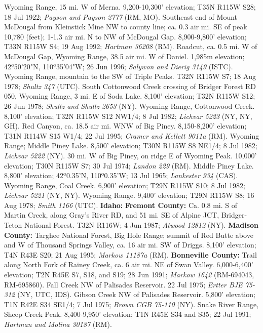 Wyoming Range, 15 mi. W of Merna. 9,200-10,300' elevation; T35N R115W S28;
18 Jul 1922; \textit{Payson and Payson 2777} (RM, MO).
Southeast end of Mount McDougal from Kleinstick Mine NW to county line; ca. 0.3
air mi. SE of peak 10,780 (feet); 1-1.3 air mi. N to NW of McDougal Gap.
8,900-9,800' elevation; T33N R115W S4; 19 Aug 1992; \textit{Hartman 36208} (RM).
Roadcut, ca. 0.5 mi. W of McDougal Gap, Wyoming Range, 38.5 air mi. W of Daniel.
1,985m elevation; 42º50'20"N, 110º35'04"W; 26 Jun 1996;
\textit{Salywon and Dierig 3149} (ISTC).
Wyoming Range, mountain to the SW of Triple Peaks. T32N R115W S7; 18 Aug 1978;
\textit{Shultz 347} (UTC).
South Cottonwood Creek crossing of Bridger Forest RD 050, Wyoming Range,
3 mi. E of Soda Lake. 8,100' elevation; T32N R115W S12; 26 Jun 1978;
\textit{Shultz and Shultz 2653} (NY).
Wyoming Range, Cottonwood Creek. 8,100' elevation; T32N R115W S12 NW1/4;
8 Jul 1982; \textit{Lichvar 5223} (NY, NY, GH).
Red Canyon, ca. 18.5 air mi. WNW of Big Piney. 8,150-8,200' elevation;
T31N R114W S15 W1/4; 22 Jul 1995; \textit{Cramer and Kellett 9011a} (RM).
Wyoming Range; Middle Piney Lake. 8,500' elevation; T30N R115W S8 NE1/4;
8 Jul 1982; \textit{Lichvar 5222} (NY).
30 mi. W of Big Piney, on ridge E of Wyoming Peak. 10,000' elevation;
T30N R115W S7; 30 Jul 1974; \textit{Landon 229} (RM).
Middle Piney Lake. 8,800' elevation; 42º0.35'N, 110º0.35'W; 13 Jul 1965;
\textit{Lankester 934} (CAS).
Wyoming Range, Coal Creek. 6,900' elevation; T29N R115W S10; 8 Jul 1982;
\textit{Lichvar 5221} (NY, NY).
Wyoming Range. 9,400' elevation; T29N R115W S8; 16 Aug 1978;
\textit{Smith 1166} (UTC).
  \textbf{Idaho:}
  \textbf{Fremont County:}
Ca. 0.8 mi. S of Martin Creek, along Gray's River RD, and 51 mi. SE of
Alpine JCT, Bridger-Teton National Forest. T32N R116W; 4 Jun 1987;
\textit{Atwood 12812} (NY).
  \textbf{Madison County:}
Targhee National Forest, Big Hole Range; summit of Red Butte above and W of
Thousand Springs Valley, ca. 16 air mi. SW of Driggs. 8,100' elevation;
T4N R43E S20; 21 Aug 1995; \textit{Markow 11187a} (RM).
  \textbf{Bonneville County:}
Trail along North Fork of Rainey Creek, ca. 6 air mi. NE of Swan Valley.
6,000-6,400' elevation; T2N R45E S7, S18, and S19; 28 Jun 1991;
\textit{Markow 1642} (RM-694043, RM-695860).
Fall Creek NW of Palisades Reservoir. 22 Jul 1975;
\textit{Ertter BJE 75-312} (NY, UTC, IDS).
Gibson Creek NW of Palisades Reservoir. 5,800' elevation; T1N R42E S34 SE1/4;
7 Jul 1975; \textit{Brown CGB 75-110} (NY).
Snake River Range, Sheep Creek Peak. 8,400-9,950' elevation;
T1N R45E S34 and S35; 22 Jul 1991; \textit{Hartman and Molina 30187} (RM).
